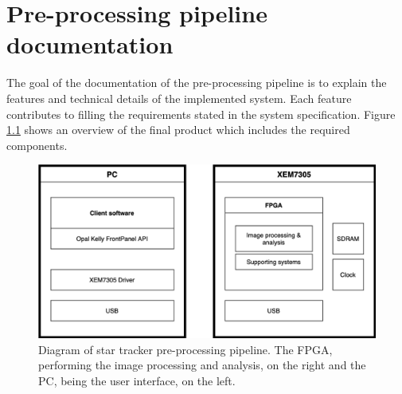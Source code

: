\documentclass[12pt]{report}
\begin{document}
\chapter{Pre-processing pipeline documentation}

The goal of the documentation of the pre-processing pipeline is to explain the features and technical details of the implemented system. Each feature contributes to filling the requirements stated in the system specification. Figure \ref{fig:overview} shows an overview of the final product which includes the required components.

\begin{figure}[h]
    \centering
    \includegraphics[scale=0.3]{figures/overview.png}
    \caption{Diagram of star tracker pre-processing pipeline. The FPGA, performing the image processing and analysis, on the right and the PC, being the user interface, on the left.}
    \label{fig:overview}
\end{figure}
\end{document}
